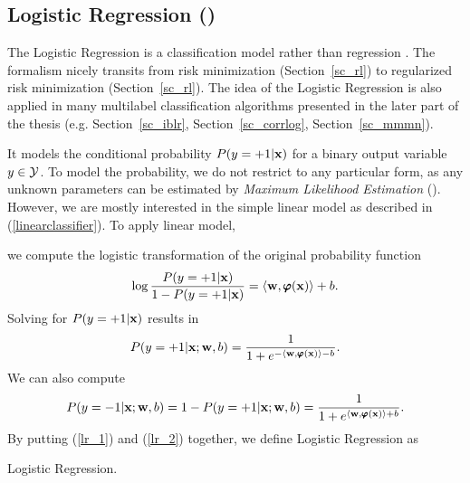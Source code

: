 {%
\subsection{Logistic Regression (\lr)}\label{sc_lr}


The Logistic Regression is a classification model rather than regression \citep{Bishop07}.
The formalism nicely transits from risk minimization (Section~\ref{sc_rl}) to regularized risk minimization (Section~\ref{sc_rl}).
The idea of the Logistic Regression is also applied in many multilabel classification algorithms presented in the later part of the thesis (e.g. Section~\ref{sc_iblr}, Section~\ref{sc_corrlog}, Section~\ref{sc_mmmn}).

It models the conditional probability $P(y=+1|\vx)$ for a binary output variable $y\in\mathcal{Y}$.
To model the probability, we do not restrict to any particular form, as any unknown parameters can be estimated by \textit{Maximum Likelihood Estimation} (\mle).
However, we are mostly interested in the simple linear model as described in (\ref{linearclassifier}).
To apply linear model,
\iffalse
the first choice is to let $P(y=+1|\vx)$ be a linear function of $\vx$, while the problem is the linear function is unbounded but the probability $P(\vx)\in[0,1]$.
Another choice is to let $\log P(y=+1|\vx)$ be a linear function of $\vx$. 
However, the problem is the log-likelihood ranges from zero to infinite but the linear function is unbounded.
The choice in Logistic Regression is to use 
\fi
we compute the logistic transformation of the original probability function
\begin{align*}
	\log\frac{P(y=+1|\mathbf {x})}{1-P(y=+1|\mathbf {x})} = \langle \mathbf {w}, \pmb \varphi(\mathbf {x}) \rangle + b.
\end{align*}
Solving for $P(y=+1|\vx)$ results in 
\begin{align}
	P(y=+1|\mathbf {x};\mathbf {w},b) = \frac{1}{1+e^{ -\langle \mathbf {w}, \pmb \varphi(\mathbf {x}) \rangle-b }}. \label{lr_1}
\end{align}
We can also compute
\begin{align}
	P(y=-1|\mathbf {x};\mathbf {w},b)=1-P(y=+1|\mathbf {x};\mathbf {w},b)=\frac{1}{1+e^{ \langle \mathbf {w}, \pmb \varphi(\mathbf {x}) \rangle+b }}. \label{lr_2}
\end{align}
By putting (\ref{lr_1}) and (\ref{lr_2}) together, we define Logistic Regression as
\begin{definition}{Logistic Regression.} \label{logistic_regression}

\end{definition}}
